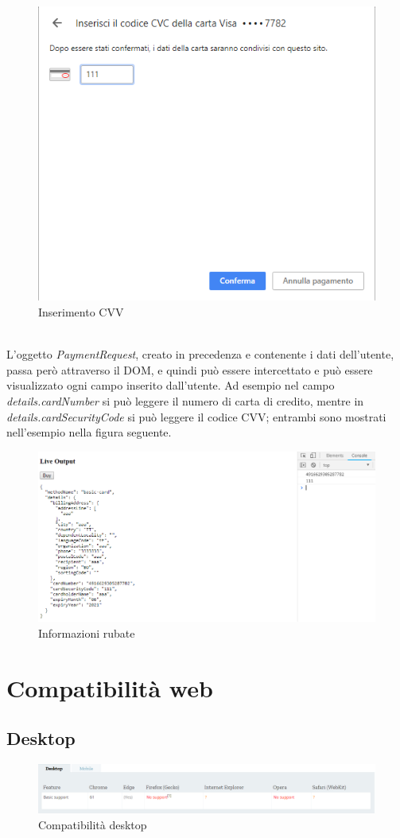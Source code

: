 \documentclass[11pt ,a4paper , twoside , openright ]{book}
\begin{document}
	\begin{figure}[h]
		\centering
		\includegraphics[width=0.5\linewidth]{Chrome2}
		\caption{Inserimento CVV}
		\label{fig: Inserimento CVV}
	\end{figure}
	\\
	\pagebreak
	L'oggetto \textit{PaymentRequest}, creato in precedenza e contenente i dati dell'utente, passa però attraverso il DOM, e quindi può essere intercettato e può essere visualizzato ogni campo inserito dall'utente. Ad esempio nel campo \textit{details.cardNumber} si può leggere il numero di carta di credito, mentre in \textit{details.cardSecurityCode} si può leggere il codice CVV; entrambi sono mostrati nell'esempio nella figura seguente.
	\begin{figure}[h]
		\centering
		\includegraphics[width=1\linewidth]{Informazioni}
		\caption{Informazioni rubate}
		\label{fig: Informazioni rubate}
	\end{figure}
	\pagebreak
	\section{Compatibilità web}
	\subsection{Desktop}
	\begin{figure}[h]
		\centering
		\includegraphics[width=1\linewidth]{Compatibilita1}
		\caption{Compatibilità desktop}
		\label{fig: Compatibilità desktop}
	\end{figure}
\end{document}
